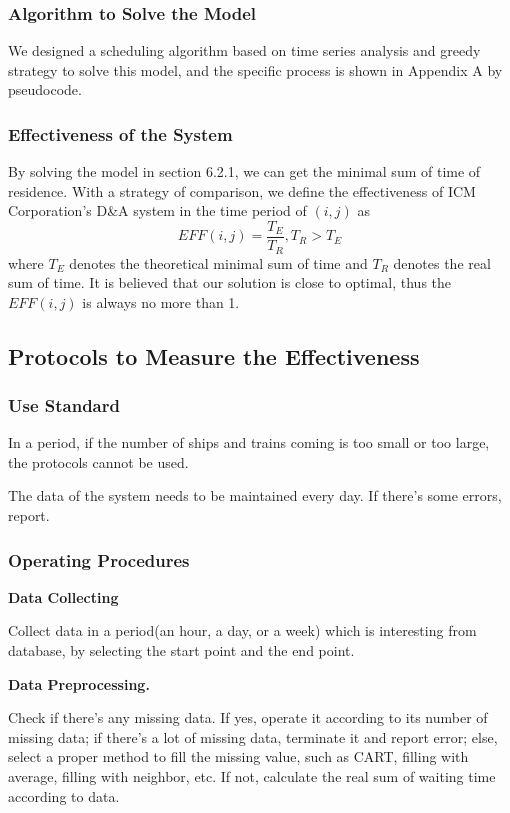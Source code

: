 \documentclass{mcmthesis}
\begin{document}
\subsubsection{Algorithm to Solve the Model}
We designed a scheduling algorithm based on time series analysis and greedy strategy to solve this model, and the specific process is shown in Appendix A by pseudocode.



\subsubsection{Effectiveness of the System}
By solving the model in section 6.2.1, we can get the minimal sum of time of residence.  With a strategy of comparison, we define the effectiveness of ICM Corporation's D\&A system in the time period of $(i,j)$  as 
\begin{equation}
    EFF(i,j)=\frac{T_E}{T_R}, T_R>T_E
\end{equation}
where $T_E$ denotes the theoretical minimal sum of time and $T_R$ denotes the real sum of time. It is believed that our solution is close to optimal, thus the $EFF(i,j)$ is always no more than 1.


\subsection{Protocols to Measure the Effectiveness}

\subsubsection{Use Standard}
In a period, if the number of ships and trains coming is too small or too large, the protocols cannot be used.

The data of the system needs to be maintained every day. If there's some errors, report. 

\subsubsection{Operating Procedures}
\textbf{Data Collecting}

Collect data in a period(an hour, a day, or a week) which is interesting from database, by selecting the start point and the end point.

\textbf{Data Preprocessing.}

Check if there's any missing data. If yes, operate it according to its number of missing data; if there's a lot of missing data, terminate it and report error; else, select a proper method to fill the missing value, such as CART, filling with average, filling with neighbor, etc. If not, calculate the real sum of waiting time according to data.
\end{document}
